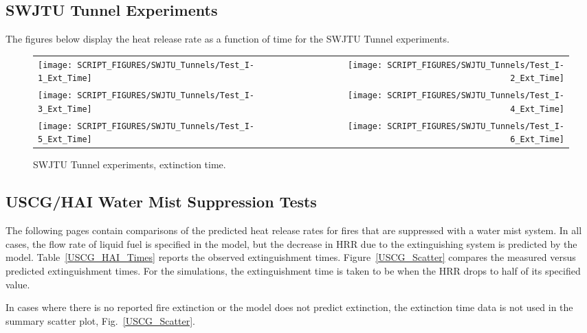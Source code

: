 \clearpage


\subsection{SWJTU Tunnel Experiments}

The figures below display the heat release rate as a function of time for the SWJTU Tunnel experiments.

\begin{figure}[!h]
\begin{tabular*}{\textwidth}{l@{\extracolsep{\fill}}r}
\texttt{[image: SCRIPT\_FIGURES/SWJTU\_Tunnels/Test\_I-1\_Ext\_Time]} &
\texttt{[image: SCRIPT\_FIGURES/SWJTU\_Tunnels/Test\_I-2\_Ext\_Time]} \\
\texttt{[image: SCRIPT\_FIGURES/SWJTU\_Tunnels/Test\_I-3\_Ext\_Time]} &
\texttt{[image: SCRIPT\_FIGURES/SWJTU\_Tunnels/Test\_I-4\_Ext\_Time]} \\
\texttt{[image: SCRIPT\_FIGURES/SWJTU\_Tunnels/Test\_I-5\_Ext\_Time]} &
\texttt{[image: SCRIPT\_FIGURES/SWJTU\_Tunnels/Test\_I-6\_Ext\_Time]}
\end{tabular*}
\caption[SWJTU Tunnel experiments, extinction time]{SWJTU Tunnel experiments, extinction time.}
\label{SWJTU_Extinction}
\end{figure}


\clearpage


\subsection{USCG/HAI Water Mist Suppression Tests}

The following pages contain comparisons of the predicted heat release rates for fires that are suppressed with a water mist system. In all cases, the flow rate of liquid fuel is specified in the model, but the decrease in HRR due to the extinguishing system is predicted by the model. Table~\ref{USCG_HAI_Times} reports the observed extinguishment times. Figure~\ref{USCG_Scatter} compares the measured versus predicted extinguishment times. For the simulations, the extinguishment time is taken to be when the HRR drops to half of its specified value.

In cases where there is no reported fire extinction or the model does not predict extinction, the extinction time data is not used in the summary scatter plot, Fig.~\ref{USCG_Scatter}.


